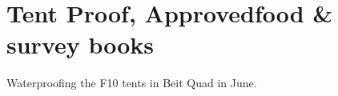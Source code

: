 

\section{Tent Proof, Approvedfood \& survey books}

\begin{marginfigure}
\checkoddpage \ifoddpage \forcerectofloat \else \forceversofloat \fi
\centering
 \caption{Waterproofing the F10 tents in Beit Quad in June. }
 \label{tentproofing}
\end{marginfigure}

